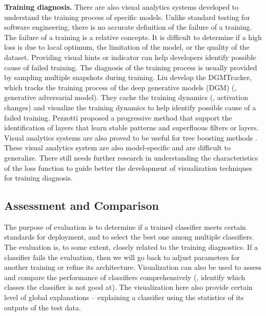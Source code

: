 \textbf{Training diagnosis.} There are also visual analytics systems developed to understand the training process of specific models. Unlike standard testing for software engineering, there is no accurate definition of the failure of a training. The failure of a training is a relative concepts. It is difficult to determine if a high loss is due to local optimum, the limitation of the model, or the quality of the dataset. Providing visual hints or indicator can help developers identify possible cause of failed training. The diagnosis of the training process is usually provided by sampling multiple snapshots during training. Liu \etal \cite{liu2017gan} develop the DGMTracker, which tracks the training process of the deep generative models (DGM) (\eg, generative adversarial model). They cache the training dynamics (\eg, activation changes) and visualize the training dynamics to help identify possible cause of a failed training. Pezzotti \etal \cite{pezzotti2017deep-eyes} proposed a progressive method that support the identification of layers that learn stable patterns and superfluous filters or layers. Visual analytics systems are also proved to be useful for tree boosting methods \cite{liu2017tree}. These visual analytics system are also model-specific and are difficult to generalize. There still needs further research in understanding the characteristics of the loss function to guide better the development of visualization techniques for training diagnosis.

\subsection{Assessment and Comparison} 

The purpose of evaluation is to determine if a trained classifier meets certain standards for deployment, and to select the best one among multiple classifiers. The evaluation is, to some extent, closely related to the training diagnostics. If a classifier fails the evaluation, then we will go back to adjust parameters for another training or refine its architecture. Visualization can also be used to assess and compare the performance of classifiers comprehensively (\eg, identify which classes the classifier is not good at). The visualization here also provide certain level of global explanations -- explaining a classifier using the statistics of its outputs of the test data. 

